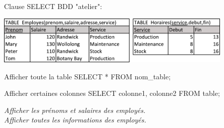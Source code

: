 \documentclass[xetex,dvipsnames]{beamer}
\begin{document}
\begin{frame}{Clause SELECT}
	BDD "atelier":
 	\begin{center}
	    	\includegraphics[width=0.85\textwidth]{./figures/BDDatelier.pdf}
	\end{center}
	\begin{alertblock}{Afficher toute la table}
		SELECT * FROM nom\_table;
	\end{alertblock}
	\begin{alertblock}{Afficher certaines colonnes}
		SELECT colonne1, colonne2 FROM table;
	\end{alertblock}
		\textit{Afficher les prénoms et salaires des employés.}\\
		\textit{Afficher toutes les informations des employés.}
\end{frame}
\end{document}
